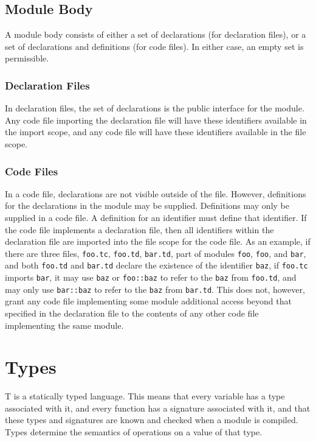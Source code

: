 \documentclass[letterpaper,12pt]{book}
\begin{document}
\section{Module Body}

A module body consists of either a set of declarations (for declaration files), or a set of declarations and definitions (for code files). In either case, an empty set is permissible.

\subsection{Declaration Files}

In declaration files, the set of declarations is the public interface for the module. Any code file importing the declaration file will have these identifiers available in the import scope, and any code file will have these identifiers available in the file scope.

\subsection{Code Files}

In a code file, declarations are not visible outside of the file. However, definitions for the declarations in the module may be supplied. Definitions may only be supplied in a code file. A definition for an identifier must define that identifier. If the code file implements a declaration file, then all identifiers within the declaration file are imported into the file scope for the code file. As an example, if there are three files, \texttt{foo.tc}, \texttt{foo.td}, \texttt{bar.td}, part of modules \texttt{foo}, \texttt{foo}, and \texttt{bar}, and both \texttt{foo.td} and \texttt{bar.td} declare the existence of the identifier \texttt{baz}, if \texttt{foo.tc} imports \texttt{bar}, it may use \texttt{baz} or \texttt{foo::baz} to refer to the \texttt{baz} from \texttt{foo.td}, and may only use \texttt{bar::baz} to refer to the \texttt{baz} from \texttt{bar.td}. This does not, however, grant any code file implementing some module additional access beyond that specified in the declaration file to the contents of any other code file implementing the same module.

\chapter{Types}

T is a statically typed language. This means that every variable has a type associated with it, and every function has a signature associated with it, and that these types and signatures are known and checked when a module is compiled. Types determine the semantics of operations on a value of that type.
\end{document}
